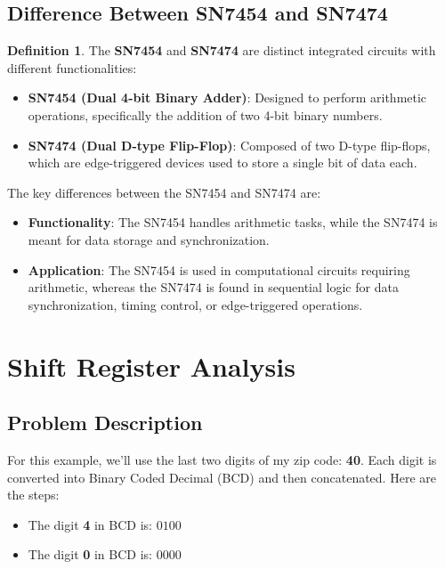 \documentclass[12pt]{article}
\theoremstyle{definition}
\newtheorem{definition}{Definition}
\begin{document}
\subsection{Difference Between SN7454 and SN7474}

\begin{definition}
	The \textbf{SN7454} and \textbf{SN7474} are distinct integrated circuits with different functionalities:
	\begin{itemize}
		\item \textbf{SN7454 (Dual 4-bit Binary Adder)}: Designed to perform arithmetic operations, specifically the addition of two 4-bit binary numbers.
		\item \textbf{SN7474 (Dual D-type Flip-Flop)}: Composed of two D-type flip-flops, which are edge-triggered devices used to store a single bit of data each.
	\end{itemize}
\end{definition}

The key differences between the SN7454 and SN7474 are:
\begin{itemize}
	\item \textbf{Functionality}: The SN7454 handles arithmetic tasks, while the SN7474 is meant for data storage and synchronization.
	\item \textbf{Application}: The SN7454 is used in computational circuits requiring arithmetic, whereas the SN7474 is found in sequential logic for data synchronization, timing control, or edge-triggered operations.
\end{itemize}

\section*{Shift Register Analysis}

\subsection*{Problem Description}
For this example, we'll use the last two digits of my zip code: \textbf{40}. Each digit is converted into Binary Coded Decimal (BCD) and then concatenated. Here are the steps:

\begin{itemize}
	\item The digit \textbf{4} in BCD is: \( 0100 \)
	\item The digit \textbf{0} in BCD is: \( 0000 \)
\end{itemize}
\end{document}
